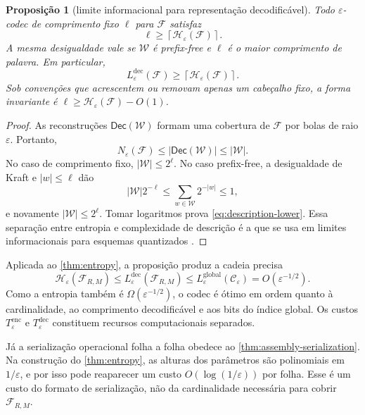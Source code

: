 \documentclass[11pt,a4paper]{article}
\newtheorem{proposition}[theorem]{Proposição}
\theoremstyle{definition}
\theoremstyle{remark}
\begin{document}
\begin{proposition}[limite informacional para representação decodificável]
\label{prop:description-lower}
Todo $\varepsilon$-codec de comprimento fixo $\ell$ para $\mathcal F$ satisfaz
\begin{equation}
 \ell\ge\left\lceil\mathcal H_\varepsilon(\mathcal F)\right\rceil.
 \label{eq:description-lower}
\end{equation}
A mesma desigualdade vale se $\mathcal W$ é prefix-free e $\ell$ é o maior
comprimento de palavra. Em particular,
\[
 L_\varepsilon^{\mathrm{dec}}(\mathcal F)
 \ge\left\lceil\mathcal H_\varepsilon(\mathcal F)\right\rceil.
\]
Sob convenções que acrescentem ou removam apenas um cabeçalho fixo, a forma
invariante é $\ell\ge\mathcal H_\varepsilon(\mathcal F)-O(1)$.
\end{proposition}

\begin{proof}
As reconstruções $\mathsf{Dec}(\mathcal W)$ formam uma cobertura de
$\mathcal F$ por bolas de raio $\varepsilon$. Portanto,
\[
 N_\varepsilon(\mathcal F)
 \le |\mathsf{Dec}(\mathcal W)|\le|\mathcal W|.
\]
No caso de comprimento fixo, $|\mathcal W|\le2^\ell$. No caso prefix-free, a
desigualdade de Kraft e $|w|\le\ell$ dão
\[
 |\mathcal W|2^{-\ell}
 \le\sum_{w\in\mathcal W}2^{-|w|}\le1,
\]
e novamente $|\mathcal W|\le2^\ell$. Tomar logaritmos prova
\eqref{eq:description-lower}. Essa separação entre entropia e complexidade de
descrição é a que se usa em limites informacionais para esquemas quantizados
\citep{bolcskei2019}.
\end{proof}

Aplicada ao \cref{thm:entropy}, a proposição produz a cadeia precisa
\begin{equation}
 \mathcal H_\varepsilon(\mathcal F_{R,M})
 \le L_\varepsilon^{\mathrm{dec}}(\mathcal F_{R,M})
 \le L_\varepsilon^{\mathrm{global}}(\mathcal C_\varepsilon)
 =O(\varepsilon^{-1/2}).
 \label{eq:complexity-chain}
\end{equation}
Como a entropia também é $\Omega(\varepsilon^{-1/2})$, o codec é ótimo em
ordem quanto à cardinalidade, ao comprimento decodificável e aos bits do
índice global. Os custos $T_\varepsilon^{\mathrm{enc}}$ e
$T_\varepsilon^{\mathrm{dec}}$ constituem recursos computacionais separados.

Já a serialização operacional folha a folha obedece ao
\cref{thm:assembly-serialization}. Na construção do \cref{thm:entropy}, as
alturas dos parâmetros são polinomiais em $1/\varepsilon$, e por isso pode
reaparecer um custo $O(\log(1/\varepsilon))$ por folha. Esse é um custo do
formato de serialização, não da cardinalidade necessária para cobrir
$\mathcal F_{R,M}$.
\end{document}
